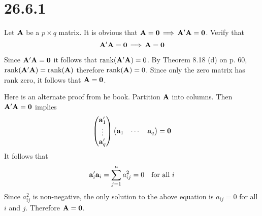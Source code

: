 \section*{26.6.1}
Let $\bf A$ be a $p\times q$ matrix. It is obvious that
${\bf A}={\bf 0}\,\Longrightarrow\,{\bf A}'{\bf A}={\bf 0}$.
Verify that
$${\bf A}'{\bf A}={\bf 0}\,\Longrightarrow\,{\bf A}={\bf 0}$$

\bigskip
\noindent
Since ${\bf A}'{\bf A}={\bf 0}$ it follows that
$\mathop{\rm rank}({\bf A}'{\bf A})=0$.
By Theorem 8.18 (d) on p. 60,
$\mathop{\rm rank}({\bf A}'{\bf A})=\mathop{\rm rank}({\bf A})$
therefore $\mathop{\rm rank}({\bf A})=0$.
Since only the zero matrix has rank zero, it follows that
${\bf A}=\bf 0$.

\bigskip
\noindent
Here is an alternate proof from he book.
Partition $\bf A$ into columns. Then ${\bf A}'{\bf A}=\bf0$ implies
$$\left(\begin{matrix}
{\bf a}_1'\cr
\vdots\cr
{\bf a}_q'
\end{matrix}\right)\left(\begin{matrix}
{\bf a}_1 & \cdots & {\bf a}_q\end{matrix}\right)={\bf 0}
$$
It follows that
$${\bf a}_i'{\bf a}_i=\sum_{j=1}^n a_{ij}^2=0\quad\hbox{for all $i$}$$
Since $a_{ij}^2$ is non-negative, the only solution to the above
equation is $a_{ij}=0$ for all $i$ and $j$.
Therefore ${\bf A}=\bf 0$.
